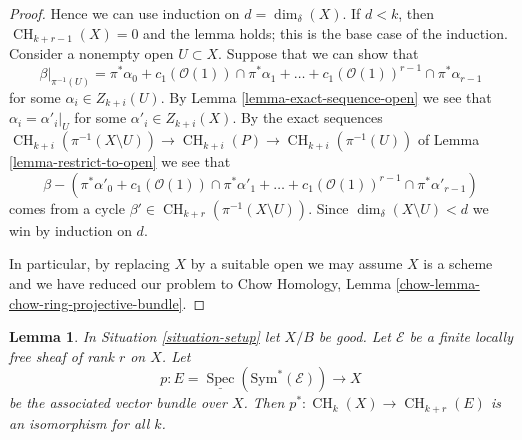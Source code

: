 \documentclass{stacks-project}
\theoremstyle{plain}
\newtheorem{lemma}[subsection]{Lemma}
\theoremstyle{definition}
\theoremstyle{remark}
\numberwithin{equation}{subsection}
\def\Spec{\mathop{\mathrm{Spec}}}
\def\CH{\mathop{\mathrm{CH}}\nolimits}
\begin{document}
\begin{proof}
\medskip\noindent
Hence we can use induction on $d = \dim_\delta(X)$.
If $d < k$, then $\CH_{k + r - 1}(X) = 0$ and the lemma holds;
this is the base case of the induction.
Consider a nonempty open $U \subset X$.
Suppose that we can show that
$$
\beta|_{\pi^{-1}(U)} =
\pi^*\alpha_0 +
c_1(\mathcal{O}(1)) \cap \pi^*\alpha_1 +
\ldots +
c_1(\mathcal{O}(1))^{r - 1} \cap \pi^*\alpha_{r - 1}
$$
for some $\alpha_i \in Z_{k + i}(U)$.
By Lemma \ref{lemma-exact-sequence-open} we see that
$\alpha_i = \alpha'_i|_U$ for some $\alpha'_i \in Z_{k + i}(X)$.
By the exact sequences
$\CH_{k + i}(\pi^{-1}(X \setminus U)) \to \CH_{k + i}(P) \to
\CH_{k + i}(\pi^{-1}(U))$
of Lemma \ref{lemma-restrict-to-open}
we see that
$$
\beta -
\left(\pi^*\alpha'_0 +
c_1(\mathcal{O}(1)) \cap \pi^*\alpha'_1 +
\ldots +
c_1(\mathcal{O}(1))^{r - 1} \cap \pi^*\alpha'_{r - 1}\right)
$$
comes from a cycle $\beta' \in \CH_{k + r}(\pi^{-1}(X \setminus U))$.
Since $\dim_\delta(X \setminus U) < d$ we win by
induction on $d$.

\medskip\noindent
In particular, by replacing $X$ by a suitable open we may assume
$X$ is a scheme and we have reduced our problem to
Chow Homology, Lemma \ref{chow-lemma-chow-ring-projective-bundle}.
\end{proof}

\begin{lemma}
\label{lemma-vectorbundle}
In Situation \ref{situation-setup} let $X/B$ be good.
Let $\mathcal{E}$ be a finite locally free sheaf of rank $r$ on $X$.
Let
$$
p :
E = \underline{\Spec}(\text{Sym}^*(\mathcal{E}))
\longrightarrow
X
$$
be the associated vector bundle over $X$.
Then $p^* : \CH_k(X) \to \CH_{k + r}(E)$ is an isomorphism for all $k$.
\end{lemma}
\end{document}
